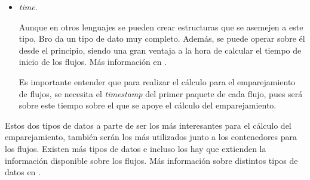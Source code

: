 \begin{itemize}
\item \textit{time}. 

\intro Aunque en otros lenguajes se pueden crear estructuras que se asemejen a este tipo, Bro da un tipo de dato muy completo. Además, 
se puede operar sobre él desde el principio, siendo una gran ventaja a la hora de calcular el tiempo de inicio de los flujos. Más 
información en \cite{timetype}.

\intro Es importante entender que para realizar el cálculo para el emparejamiento de flujos, se necesita el 
\textit{timestamp} del primer paquete de cada flujo, pues será sobre este tiempo sobre el que se apoye el 
cálculo del emparejamiento.

\end{itemize}

\intro Estos dos tipos de datos a parte de ser los más interesantes para el cálculo del emparejamiento, también 
serán los más utilizados junto a los contenedores para los flujos. Existen más tipos de datos e incluso los hay que 
extienden la información disponible sobre los flujos. Más información sobre distintos tipos de datos en \cite{conntype}.
